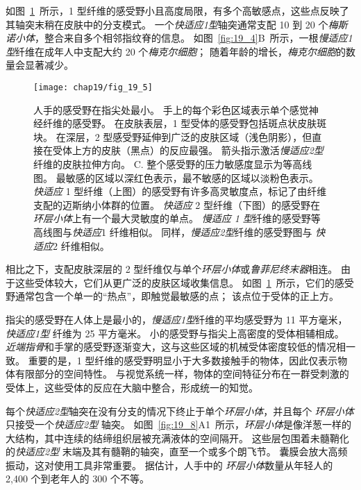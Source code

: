 如图~\ref{fig:19_5}~所示，1 型纤维的感受野小且高度局限，有多个高敏感点，这些点反映了其轴突末稍在皮肤中的分支模式。
一个\textit{快适应1型}轴突通常支配 10 到 20 个\textit{梅斯诺小体}，整合来自多个相邻指纹脊的信息。
如图~\ref{fig:19_4}B~所示，一根\textit{慢适应1型}纤维在成年人中支配大约 20 个\textit{梅克尔细胞}；
随着年龄的增长，\textit{梅克尔细胞}的数量会显著减少。


\begin{figure}[htbp]
	\centering
	\texttt{[image: chap19/fig\_19\_5]}
	\caption{人手的感受野在指尖处最小。
		手上的每个彩色区域表示单个感觉神经纤维的感受野\cite{johansson1983tactile}。
		在皮肤表层，1 型受体的感受野包括斑点状皮肤斑块。
		在深层，2 型感受野延伸到广泛的皮肤区域（浅色阴影），但直接在受体上方的皮肤（黑点）的反应最强。 
		箭头指示激活\textit{慢适应2型}纤维的皮肤拉伸方向。
		C. 整个感受野的压力敏感度显示为等高线图。
		最敏感的区域以深红色表示，最不敏感的区域以淡粉色表示。
		\textit{快适应} 1 型纤维（上图）的感受野有许多高灵敏度点，标记了由纤维支配的迈斯纳小体群的位置。
		\textit{快适应} 2 型纤维（下图）的感受野在\textit{环层小体}上有一个最大灵敏度的单点。
		\textit{慢适应 1 型}纤维的感受野等高线图与\textit{快适应}1 纤维相似。
		同样，\textit{慢适应2型}纤维的感受野图与 \textit{快适应}2 纤维相似。}
	\label{fig:19_5}
\end{figure}


相比之下，支配皮肤深层的 2 型纤维仅与单个\textit{环层小体}或\textit{鲁菲尼终末器}相连。
由于这些受体较大，它们从更广泛的皮肤区域收集信息。 
如图~\ref{fig:19_5}~所示，它们的感受野通常包含一个单一的“热点”，即触觉最敏感的点；
该点位于受体的正上方。


指尖的感受野在人体上是最小的，\textit{慢适应1型}纤维的平均感受野为 11 平方毫米，\textit{快适应1型} 纤维为 25 平方毫米。
小的感受野与指尖上高密度的受体相辅相成。
\textit{近端指骨}和手掌的感受野逐渐变大，这与这些区域的机械受体密度较低的情况相一致。
重要的是，1 型纤维的感受野明显小于大多数接触手的物体，因此仅表示物体有限部分的空间特性。
与视觉系统一样，物体的空间特征分布在一群受刺激的受体上，这些受体的反应在大脑中整合，形成统一的知觉。


每个\textit{快适应2型}轴突在没有分支的情况下终止于单个\textit{环层小体}，并且每个 \textit{环层小体}只接受一个\textit{快适应2型} 轴突。
如图~\ref{fig:19_8}A1~所示，\textit{环层小体}是像洋葱一样的大结构，其中连续的结缔组织层被充满液体的空间隔开。
这些层包围着未髓鞘化的\textit{快适应2型} 末端及其有髓鞘的轴突，直至一个或多个朗飞节。
囊膜会放大高频振动，这对使用工具非常重要。
据估计，人手中的 \textit{环层小体}数量从年轻人的 2,400 个到老年人的 300 个不等。


